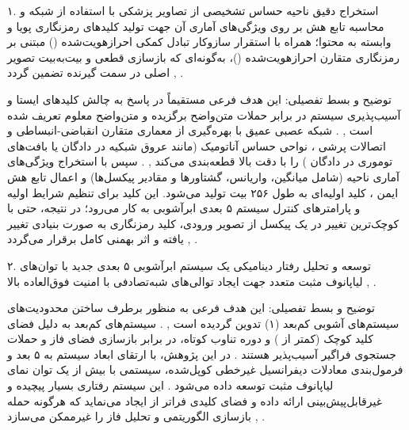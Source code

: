 

۱. استخراج دقیق ناحیه حساس تشخیصی  از تصاویر پزشکی با استفاده از شبکه  و محاسبه تابع هش  بر روی ویژگی‌های آماری آن جهت تولید کلیدهای رمزنگاری پویا و وابسته به محتوا؛ همراه با استقرار سازوکار تبادل کمکی احرازهویت‌شده () مبتنی بر رمزنگاری متقارن احرازهویت‌شده ()، به‌گونه‌ای که بازسازی قطعی و بیت‌به‌بیت تصویر اصلی در سمت گیرنده تضمین گردد , .\par

توضیح و بسط تفصیلی: این هدف فرعی مستقیماً در پاسخ به چالش کلیدهای ایستا و آسیب‌پذیری سیستم در برابر حملات متن‌واضح برگزیده  و متن‌واضح معلوم  تعریف شده است , . شبکه عصبی عمیق  با بهره‌گیری از معماری متقارن انقباضی{-}انبساطی و اتصالات پرشی ، نواحی حساس آناتومیک (مانند عروق شبکیه در دادگان  یا بافت‌های توموری در دادگان ) را با دقت بالا قطعه‌بندی می‌کند , . سپس با استخراج ویژگی‌های آماری ناحیه  (شامل میانگین، واریانس، گشتاورها و مقادیر پیکسل‌ها) و اعمال تابع هش ایمن ، کلید اولیه‌ای به طول ۲۵۶ بیت تولید می‌شود. این کلید برای تنظیم شرایط اولیه و پارامترهای کنترل سیستم ۵ بعدی ابرآشوبی به کار می‌رود؛ در نتیجه، حتی با کوچک‌ترین تغییر در یک پیکسل از تصویر ورودی، کلید رمزنگاری به صورت بنیادی تغییر یافته و اثر بهمنی  کامل برقرار می‌گردد , .\par



۲. توسعه و تحلیل رفتار دینامیکی یک سیستم ابرآشوبی ۵ بعدی جدید با توان‌های لیاپانوف مثبت متعدد جهت ایجاد توالی‌های شبه‌تصادفی با امنیت فوق‌العاده بالا , .\par

توضیح و بسط تفصیلی: این هدف فرعی به منظور برطرف ساختن محدودیت‌های سیستم‌های آشوبی کم‌بعد (۱) تدوین گردیده است , . سیستم‌های کم‌بعد به دلیل فضای کلید کوچک (کمتر از ) و دوره تناوب کوتاه، در برابر بازسازی فضای فاز و حملات جستجوی فراگیر  آسیب‌پذیر هستند . در این پژوهش، با ارتقای ابعاد سیستم به ۵ بعد و فرمول‌بندی معادلات دیفرانسیل غیرخطی کوپل‌شده، سیستمی با بیش از یک توان نمای لیاپانوف مثبت  توسعه داده می‌شود . این سیستم رفتاری بسیار پیچیده و غیرقابل‌پیش‌بینی ارائه داده و فضای کلیدی فراتر از  ایجاد می‌نماید که هرگونه حمله بازسازی الگوریتمی و تحلیل فاز را غیرممکن می‌سازد , .\par

